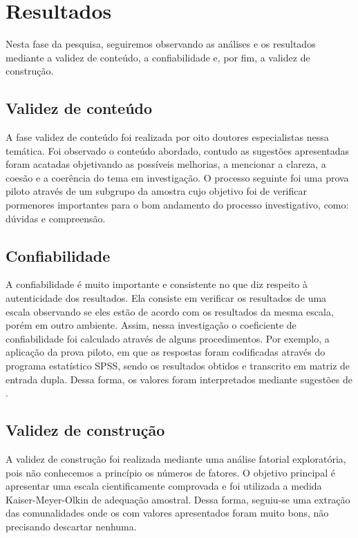 \documentclass[portuguese]{textolivre}
\begin{document}
\section{Resultados}\label{sec-resumo}
Nesta fase da pesquisa, seguiremos observando as análises e os resultados mediante a validez de conteúdo, a confiabilidade e, por fim, a validez de construção. 

\subsection{Validez de conteúdo}\label{sec-secoes}
A fase validez de conteúdo foi realizada por oito doutores especialistas nessa temática. Foi observado o conteúdo abordado, contudo as sugestões apresentadas foram acatadas objetivando as possíveis melhorias, a mencionar a clareza, a coesão e a coerência do tema em investigação. O processo seguinte foi uma prova piloto através de um subgrupo da amostra cujo objetivo foi de verificar pormenores importantes para o bom andamento do processo investigativo, como: dúvidas e compreensão.

\subsection{Confiabilidade }\label{sec-format-simple}
A confiabilidade é muito importante e consistente no que diz respeito à autenticidade dos resultados. Ela consiste em verificar os resultados de uma escala observando se eles estão de acordo com os resultados da mesma escala, porém em outro ambiente. Assim, nessa investigação o coeficiente de confiabilidade foi calculado através de alguns procedimentos. Por exemplo, a aplicação da prova piloto, em que as respostas foram codificadas através do programa estatístico SPSS, sendo os resultados obtidos e transcrito em matriz de entrada dupla. Dessa forma, os valores foram interpretados mediante sugestões de \textcite{ruiz_instrumentos_1998}. 

\subsection{Validez de construção}\label{sec-links}
A validez de construção foi realizada mediante uma análise fatorial exploratória, pois não conhecemos a princípio os números de fatores. O objetivo principal é apresentar uma escala cientificamente comprovada e foi utilizada a medida Kaiser-Meyer-Olkin de adequação amostral. Dessa forma, seguiu-se uma extração das comunalidades onde os com valores apresentados foram muito bons, não precisando descartar nenhuma. 
\end{document}
